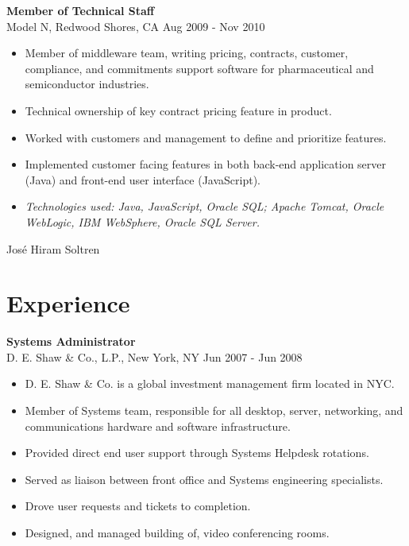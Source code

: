 \documentclass[line,margin]{res}
\begin{document}
\begin{resume}
\textbf{Member of Technical Staff} \\
Model N, Redwood Shores, CA \hfill Aug 2009 - Nov 2010
\begin{itemize}  \itemsep -2pt %
\item Member of middleware team, writing pricing, contracts, customer,
      compliance, and commitments support software for pharmaceutical and
      semiconductor industries.
\item Technical ownership of key contract pricing feature in product.
\item Worked with customers and management to define and prioritize features.
\item Implemented customer facing features in both back-end application server
      (Java) and front-end user interface (JavaScript).
\item \textit{Technologies used: Java, JavaScript, Oracle SQL; Apache Tomcat,
              Oracle\\\mbox{WebLogic}, IBM WebSphere, Oracle SQL Server.}
\end{itemize}

\newpage

{ \sffamily Jos\'e Hiram Soltren} \\ 

\section{Experience}

\textbf{Systems Administrator} \\
D. E. Shaw \& Co., L.P., New York, NY \hfill Jun 2007 - Jun 2008
\begin{itemize}  \itemsep -2pt %
\item D. E. Shaw \& Co. is a global investment management firm located in NYC.
\item Member of Systems team, responsible for all desktop, server, networking,
      and communications hardware and software infrastructure.
\item Provided direct end user support through Systems Helpdesk rotations.
\item Served as liaison between front office and Systems engineering
      specialists.
\item Drove user requests and tickets to completion.
\item Designed, and managed building of, video conferencing rooms.
\end{itemize}



\end{resume}
\end{document}
